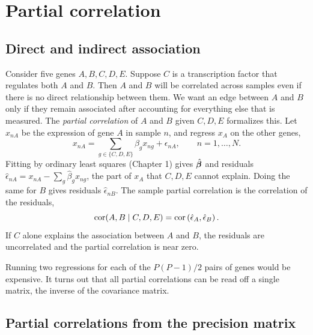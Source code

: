 \section{Partial correlation}
\label{sec:partial_corr}

\subsection{Direct and indirect association}

Consider five genes $A,B,C,D,E$. Suppose $C$ is a transcription factor that regulates both $A$ and $B$. Then $A$ and $B$ will be correlated across samples even if there is no direct relationship between them. We want an edge between $A$ and $B$ only if they remain associated after accounting for everything else that is measured. The \emph{partial correlation} of $A$ and $B$ given $C,D,E$ formalizes this. Let $x_{nA}$ be the expression of gene $A$ in sample $n$, and regress $x_A$ on the other genes,
\begin{equation}
  x_{nA} = \sum_{g\in\{C,D,E\}}\beta_gx_{ng} + \epsilon_{nA}, \qquad n=1,\dots,N.
\end{equation}
Fitting by ordinary least squares (Chapter 1) gives $\hat{\boldsymbol{\beta}}$ and residuals $\hat\epsilon_{nA}=x_{nA}-\sum_g\hat\beta_gx_{ng}$, the part of $x_A$ that $C,D,E$ cannot explain. Doing the same for $B$ gives residuals $\hat\epsilon_{nB}$. The sample partial correlation is the correlation of the residuals,
\begin{equation}
  \operatorname{cor}(A,B\mid C,D,E) = \operatorname{cor}\left(\hat\epsilon_A,\hat\epsilon_B\right).
\end{equation}
If $C$ alone explains the association between $A$ and $B$, the residuals are uncorrelated and the partial correlation is near zero.

Running two regressions for each of the $P(P-1)/2$ pairs of genes would be expensive. It turns out that all partial correlations can be read off a single matrix, the inverse of the covariance matrix.

\subsection{Partial correlations from the precision matrix}

